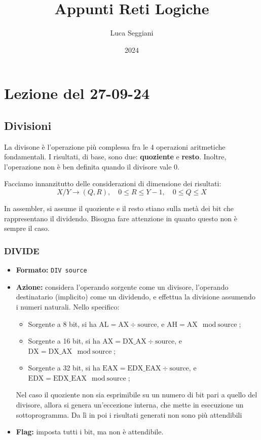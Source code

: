 \documentclass[a4paper,11pt]{article}
\title{Appunti Reti Logiche}
\author{Luca Seggiani}
\date{2024}
\begin{document}
\section{Lezione del 27-09-24}

\thispagestyle{empty}
\pagestyle{fancy}

\subsection{Divisioni}
La divisone è l'operazione più complessa fra le 4 operazioni aritmetiche fondamentali.
I risultati, di base, sono due: \textbf{quoziente} e \textbf{resto}.
Inoltre, l'operazione non è ben definita quando il divisore vale 0.

Facciamo innanzitutto delle considerazioni di dimensione dei risultati:
$$
X / Y \rightarrow (Q, R), \quad
0 \leq R \leq Y - 1, \quad
0 \leq Q \leq X
$$

In assembler, si assume il quoziente e il resto stiano sulla metà dei bit che rappresentano il dividendo.
Bisogna fare attenzione in quanto questo non è sempre il caso.

\subsubsection{DIVIDE}
\begin{itemize}
	\item \textbf{Formato:} \texttt{DIV source}
	\item \textbf{Azione:} considera l'operando sorgente come un divisore, l'operando destinatario (implicito) come un dividendo, e effettua la divisione assumendo i numeri naturali. Nello specifico:
	\begin{itemize}
	\item Sorgente a 8 bit, si ha $\text{AL} = \text{AX} \div \text{source}$, e $ \text{AH} = \text{AX} \mod \text{source} $;
	\item Sorgente a 16 bit, si ha $\text{AX} = \text{DX\_AX} \div \text{source}$, e $ \text{DX} = \text{DX\_AX} \mod \text{source} $;
	\item Sorgente a 32 bit, si ha $\text{EAX} = \text{EDX\_EAX} \div \text{source}$, e $ \text{EDX} = \text{EDX\_EAX} \mod \text{source} $;
	\end{itemize}
		Nel caso il quoziente non sia esprimibile su un numero di bit pari a quello del divisore, allora si genera un'eccezione interna, che mette in esecuzione un sottoprogramma.
		Da lì in poi i risultati generati non sono più attendibili
	\item \textbf{Flag:} imposta tutti i bit, ma non è attendibile. 
\end{itemize}
\end{document}
